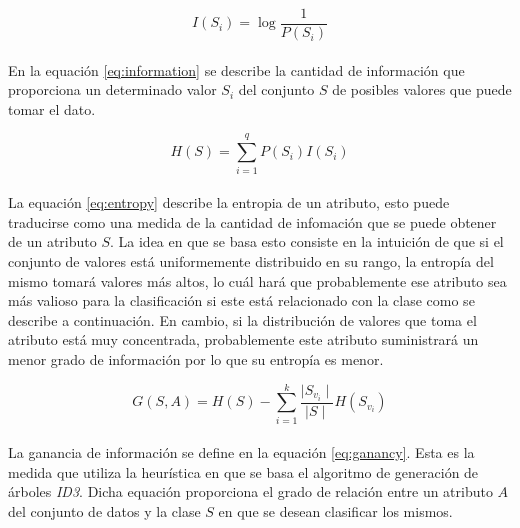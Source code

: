 \documentclass[10pt, a4paper,spanish]{article}
\begin{document}
		\begin{equation}
			\label{eq:information}
			I(S_i) = \log \frac{1}{P(S_i)}
		\end{equation}

		\paragraph{}
		En la equación \eqref{eq:information} se describe la cantidad de información que proporciona un determinado valor $S_i$ del conjunto $S$ de posibles valores que puede tomar el dato.

		\begin{equation}
			\label{eq:entropy}
			H(S) = \sum_{i=1}^q P(S_i)I(S_i)
		\end{equation}

		\paragraph{}
		La equación \eqref{eq:entropy} describe la entropia de un atributo, esto puede traducirse como una medida de la cantidad de infomación que se puede obtener de un atributo $S$. La idea en que se basa esto consiste en la intuición de que si el conjunto de valores está uniformemente distribuido en su rango, la entropía del mismo tomará valores más altos, lo cuál hará que probablemente ese atributo sea más valioso para la clasificación si este está relacionado con la clase como se describe a continuación. En cambio, si la distribución de valores que toma el atributo está muy concentrada, probablemente este atributo suministrará un menor grado de información por lo que su entropía es menor.


		\begin{equation}
			\label{eq:ganancy}
			G(S, A) = H(S) - \sum_{i=1}^k \frac{\mid S_{v_i} \mid }{ \mid S \mid }H(S_{v_i})
		\end{equation}

		\paragraph{}
		La ganancia de información se define en la equación \eqref{eq:ganancy}. Esta es la medida que utiliza la heurística en que se basa el algoritmo de generación de árboles \emph{ID3}. Dicha equación proporciona el grado de relación entre un atributo $A$ del conjunto de datos y la clase $S$ en que se desean clasificar los mismos.

		\paragraph{}
\end{document}
